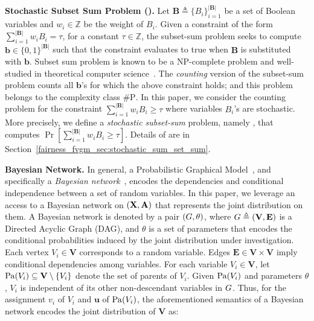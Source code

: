 	\textbf{Stochastic Subset Sum Problem ({\stochastic}).} 
	Let $ \mathbf{B} \triangleq \{B_i\}_{i=1}^{|\mathbf{B}|}$ be a set of Boolean variables and $ w_i \in \mathbb{Z} $ be the weight of $ B_i $. Given a constraint of the form  $\sum_{i = 1}^ {|\mathbf{B}|} w_i B_i = \tau $, for a constant $ \tau \in \mathbb{Z} $, the subset-sum problem seeks to compute $\mathbf{b} \in \{0,1\}^{|\mathbf{B}|}$ such that the constraint evaluates to true when $\mathbf{B}$ is substituted with $\mathbf{b}$. Subset sum problem is known to be a $ \mathrm{NP} $-complete problem and well-studied in theoretical computer science~\cite{kleinberg2006algorithm}. The \textit{counting} version of the subset-sum problem counts all $ \mathbf{b} $'s for which the above constraint holds; and this problem belongs to the complexity class $ \mathrm{\#P} $. In this paper, we consider the counting problem for the constraint $\sum_{i = 1}^ {|\mathbf{B}|} w_i B_i \ge \tau $ where variables $ B_i $'s are stochastic. More precisely, we define a \textit{stochastic subset-sum} problem, namely {\stochastic}, that computes $ \Pr[\sum_{i = 1}^ {|\mathbf{B}|} w_iB_i \ge \tau] $.    Details of {\stochastic} are in Section~\ref{fairness_fvgm_sec:stochastic_sum_set_sum}.
	
	
		
	\textbf{Bayesian Network.}
	In general, a Probabilistic Graphical Model~\cite{koller2009probabilistic}, and specifically a \textit{Bayesian network}~\cite{pearl1985bayesian,chavira2008probabilistic}, encodes the dependencies and conditional independence between a set of random variables. In this paper, we leverage an access to a Bayesian network on $(\mathbf{X}, \mathbf{A})$ that represents the joint distribution on them. 
	A Bayesian network is denoted by a pair $ (G, \theta)$, where $ G \triangleq (\mathbf{V}, \mathbf{E}) $ is a Directed Acyclic Graph (DAG), and $\theta$ is a set of parameters that encodes the conditional probabilities induced by the joint distribution under investigation. Each vertex $V_i \in \mathbf{V}$ corresponds to a random variable. Edges $ \mathbf{E} \in \mathbf{V} \times \mathbf{V} $ imply conditional dependencies among variables. For each variable $ V_i \in \mathbf{V} $, let $ \mathrm{Pa}(V_i) \subseteq \mathbf{V} \setminus \{V_i\} $ denote the set of parents of $ V_i $. Given $\mathrm{Pa}(V_i)$ and parameters $\theta$, $ V_i $ is independent of its other non-descendant variables in $G$. Thus, for the assignment $ v_i $ of $ V_i $ and $ \mathbf{u} $ of $ \mathrm{Pa}(V_i) $, the aforementioned semantics of a Bayesian network encodes the joint distribution of $\mathbf{V}$ as:
	
